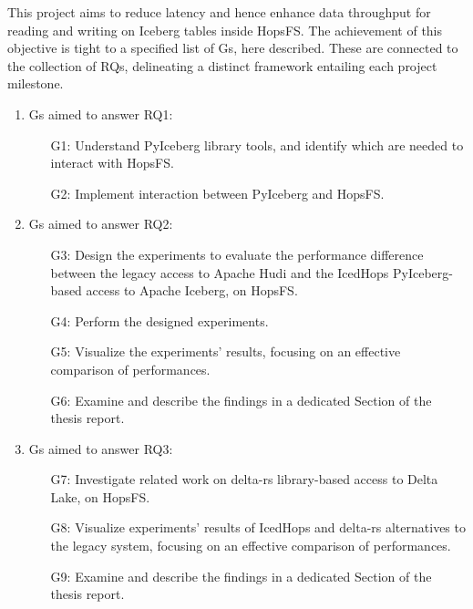 This project aims to reduce latency and hence enhance data throughput for reading and writing on Iceberg tables inside \gls{HopsFS}. The achievement of this objective is tight to a specified list of \glspl{G}, here described. These are connected to the collection of \glspl{RQ}, delineating a distinct framework entailing each project milestone.

\begin{enumerate}
    \item \glspl{G} aimed to answer RQ1: 
        \begin{enumerate}
            \item[G1:] Understand PyIceberg library tools, and identify which are needed to interact with \gls{HopsFS}.
            \item[G2:] Implement interaction between PyIceberg and \gls{HopsFS}.
        \end{enumerate}
    \item \glspl{G} aimed to answer RQ2: 
        \begin{enumerate}
            \item[G3:] Design the experiments to evaluate the performance difference between the legacy access to Apache Hudi and the IcedHops PyIceberg-based access to Apache Iceberg, on \gls{HopsFS}. 
            \item[G4:] Perform the designed experiments.
            \item[G5:] Visualize the experiments' results, focusing on an effective comparison of performances.
            \item[G6:] Examine and describe the findings in a dedicated Section of the thesis report.
        \end{enumerate}
    \item \glspl{G} aimed to answer RQ3:
        \begin{enumerate}
            \item[G7:] Investigate related work on delta-rs library-based access to Delta Lake, on \gls{HopsFS}.
            \item[G8:] Visualize experiments' results of IcedHops and delta-rs alternatives to the legacy system, focusing on an effective comparison of performances.
            \item[G9:] Examine and describe the findings in a dedicated Section of the thesis report.
        \end{enumerate}
\end{enumerate}

